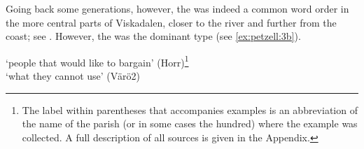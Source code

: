 \documentclass[output=paper,colorlinks,citecolor=brown,draft,draftmode]{langscibook}
\begin{document}
\ea\label{ex:petzell:2}
\z
\z

Going back some generations, however, the  was indeed a common  word order in the more central parts of Viskadalen, closer to the river and further from the coast; see . However, the  was the dominant type (see \ref{ex:petzell:3b}).


\ea\label{ex:petzell:3}
\glt `people that would like to bargain’ (Horr)\footnote{The label within parentheses that accompanies  examples is an abbreviation of the name of the parish (or in some cases the hundred) where the example was collected. A full description of all sources is given in the Appendix.}  \\
\glt `what they cannot use’ (Värö2)
\z
\z
\end{document}
